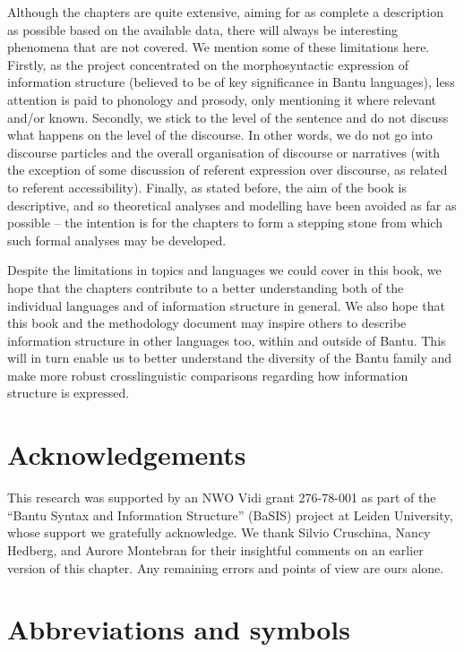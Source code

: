 \documentclass[output=paper]{langscibook}
\begin{document}
Although the chapters are quite extensive, aiming for as complete a description as possible based on the available data, there will always be interesting phenomena that are not covered. We mention some of these limitations here. Firstly, as the project concentrated on the morphosyntactic expression of information structure (believed to be of key significance in Bantu languages), less attention is paid to phonology and prosody, only mentioning it where relevant and/or known. Secondly, we stick to the level of the sentence and do not discuss what happens on the level of the discourse. In other words, we do not go into discourse particles and the overall organisation of discourse or narratives (with the exception of some discussion of referent expression over discourse, as related to referent accessibility). Finally, as stated before, the aim of the book is descriptive, and so theoretical analyses and modelling have been avoided as far as possible – the intention is for the chapters to form a stepping stone from which such formal analyses may be developed.

Despite the limitations in topics and languages we could cover in this book, we hope that the chapters contribute to a better understanding both of the individual languages and of information structure in general. We also hope that this book and the methodology document may inspire others to describe information structure in other languages too, within and outside of Bantu. This will in turn enable us to better understand the diversity of the Bantu family and make more robust crosslinguistic comparisons regarding how information structure is expressed.  

\section*{Acknowledgements}

This research was supported by an NWO Vidi grant 276-78-001 as part of the “Bantu Syntax and Information Structure” (BaSIS) project at Leiden University, whose support we gratefully acknowledge. We thank Silvio Cruschina, Nancy Hedberg, and Aurore Montebran for their insightful comments on an earlier version of this chapter. Any remaining errors and points of view are ours alone.

\section*{Abbreviations and symbols}\largerpage
\end{document}
